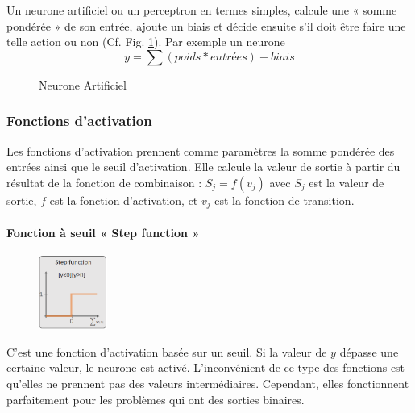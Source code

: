 Un neurone artificiel ou un perceptron en termes simples, calcule une « somme pondérée » de son entrée, ajoute un biais et décide ensuite s’il doit être faire une telle action ou non (Cf. Fig. \ref{neuron_art}).
Par exemple un neurone $$y=\sum(poids*entrées)+biais$$

\begin{figure}[!htb]
        \caption{Neurone Artificiel}
        \label{neuron_art}
\end{figure}

\subsubsection{Fonctions d’activation}\label{fun_activ}
Les fonctions d'activation prennent comme paramètres la somme pondérée des entrées ainsi que le seuil d’activation. Elle calcule la valeur de sortie à partir du résultat de la fonction de combinaison : $S_j=f(v_j)$ avec $S_j$ est la valeur de sortie, $f$ est la fonction d’activation, et $v_j$ est la fonction de transition.

\paragraph*{Fonction à seuil « Step function »}
\begin{figure}
    \vspace{-1 cm}
    \includegraphics[width=0.2\textwidth]{img/stepfunc.png}
    \vspace{-1 cm}
\end{figure}
C’est une fonction d’activation basée sur un seuil. Si la valeur de $y$ dépasse une certaine valeur, le neurone est activé. L’inconvénient de ce type des fonctions est qu'elles ne prennent pas des valeurs intermédiaires. Cependant, elles fonctionnent parfaitement pour les problèmes qui ont des sorties binaires. 


